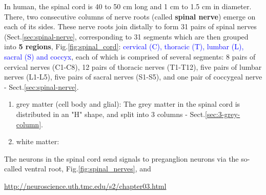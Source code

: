 \begin{multicols}{2}
In human, the spinal cord is 40 to 50 cm long and 1 cm to 1.5 cm in diameter. 
There, two consecutive columns of nerve roots (called {\bf spinal nerve}) emerge
on each of its sides. These nerve roots join distally
to form 31 pairs of spinal nerves (Sect.\ref{sec:spinal-nerve},
corresponding to 31 segments which are then grouped into {\bf 5 regions},
Fig.\ref{fig:spinal_cord}:
\textcolor{blue}{cervical (C), thoracic (T), lumbar (L), sacral (S) and
coccyx}, each of which is comprised of several segments:
8 pairs of cervical nerves (C1-C8), 12 pairs of thoracic nerves (T1-T12), five
pairs of lumbar nerves (L1-L5), five pairs of sacral nerves (S1-S5), and one
pair of coccygeal nerve - Sect.\ref{sec:spinal-nerve}.  

\end{multicols}





\begin{enumerate}
  \item grey matter (cell body and glial): 
  The grey matter in the spinal cord is distributed in an "H" shape, and split
  into 3 columns - Sect.\ref{sec:3-grey-column}.
         
  \item white matter: 
\end{enumerate}
The neurons in the spinal cord send signals to preganglion neurons via the
so-called ventral root, Fig.\ref{fig:spinal_nerves}, and 



\url{http://neuroscience.uth.tmc.edu/s2/chapter03.html}

